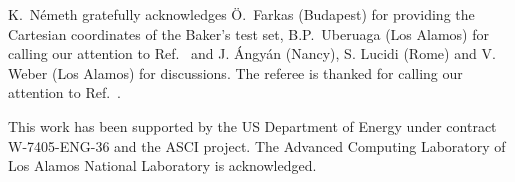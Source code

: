 \documentclass[prl,twocolumn,showpacs,twocolumngrid,superbib]{revtex4}
\newcommand{\commentoutB}[1]{}
\begin{document}
\begin{acknowledgments}
K.~N{\'e}meth gratefully acknowledges {\"{O}}.~Farkas (Budapest) for providing the 
Cartesian coordinates of the Baker's test set,  B.P.~Uberuaga (Los Alamos) for 
calling our attention to Ref.~\cite{FErcolessi94} and  J. {\'A}ngy{\'a}n
(Nancy), S. Lucidi (Rome) and V. Weber (Los Alamos) for discussions.
The referee is thanked for calling our attention to 
Ref.~.

This work has been supported by the US Department of Energy 
under contract W-7405-ENG-36 and the ASCI project.  
The Advanced Computing Laboratory of Los 
Alamos National Laboratory is acknowledged.
\end{acknowledgments}



\commentoutB{

\clearpage


}
\end{document}
